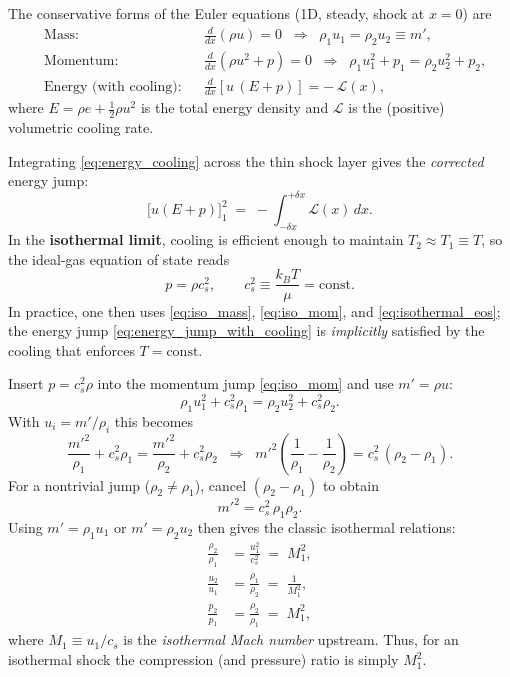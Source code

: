 The conservative forms of the Euler equations (1D, steady, shock at $x=0$) are
\begin{align}
&\text{Mass:} && \frac{d}{dx}(\rho u) = 0
\;\;\Longrightarrow\;\;
\rho_1 u_1 = \rho_2 u_2 \equiv m', \label{eq:iso_mass}\\[4pt]
&\text{Momentum:} && \frac{d}{dx}\!\left(\rho u^2 + p\right) = 0
\;\;\Longrightarrow\;\;
\rho_1 u_1^2 + p_1 = \rho_2 u_2^2 + p_2, \label{eq:iso_mom}\\[4pt]
&\text{Energy (with cooling):} && 
\frac{d}{dx}\!\left[u\,(E+p)\right] = -\,\mathcal{L}(x), \label{eq:energy_cooling}
\end{align}
where $E=\rho e + \tfrac{1}{2}\rho u^2$ is the total energy density and $\mathcal{L}$ is the (positive) volumetric cooling rate.

Integrating \eqref{eq:energy_cooling} across the thin shock layer gives the \emph{corrected} energy jump:
\begin{equation}
\big[u(E+p)\big]_1^2 \;=\; - \int_{-\delta x}^{+\delta x} \mathcal{L}(x)\,dx.
\label{eq:energy_jump_with_cooling}
\end{equation}
In the \textbf{isothermal limit}, cooling is efficient enough to maintain $T_2 \approx T_1 \equiv T$, so the ideal-gas equation of state reads
\begin{equation}
p = \rho c_s^2, \qquad c_s^2 \equiv \frac{k_B T}{\mu} = \text{const.}
\label{eq:isothermal_eos}
\end{equation}
In practice, one then uses \eqref{eq:iso_mass}, \eqref{eq:iso_mom}, and \eqref{eq:isothermal_eos}; the energy jump \eqref{eq:energy_jump_with_cooling} is \emph{implicitly} satisfied by the cooling that enforces $T=\text{const.}$

Insert $p=c_s^2\rho$ into the momentum jump \eqref{eq:iso_mom} and use $m'=\rho u$:
\[
\rho_1 u_1^2 + c_s^2 \rho_1 
= \rho_2 u_2^2 + c_s^2 \rho_2.
\]
With $u_i = m'/\rho_i$ this becomes
\[
\frac{m'^2}{\rho_1} + c_s^2 \rho_1
= \frac{m'^2}{\rho_2} + c_s^2 \rho_2
\;\;\Longrightarrow\;\;
m'^2\!\left(\frac{1}{\rho_1}-\frac{1}{\rho_2}\right)
= c_s^2\,(\rho_2-\rho_1).
\]
For a nontrivial jump ($\rho_2\neq\rho_1$), cancel $(\rho_2-\rho_1)$ to obtain
\begin{equation}
m'^2 = c_s^2\,\rho_1\rho_2.
\label{eq:mprime_iso}
\end{equation}
Using $m'=\rho_1 u_1$ or $m'=\rho_2 u_2$ then gives the classic isothermal relations:
\begin{align}
\frac{\rho_2}{\rho_1} 
&= \frac{u_1^2}{c_s^2} \;=\; M_1^2, \label{eq:iso_density_jump}\\[4pt]
\frac{u_2}{u_1} 
&= \frac{\rho_1}{\rho_2} \;=\; \frac{1}{M_1^2}, \label{eq:iso_velocity_jump}\\[4pt]
\frac{p_2}{p_1} 
&= \frac{\rho_2}{\rho_1} \;=\; M_1^2, \label{eq:iso_pressure_jump}
\end{align}
where $M_1 \equiv u_1/c_s$ is the \emph{isothermal Mach number} upstream. Thus, for an isothermal shock the compression (and pressure) ratio is simply $M_1^2$.


